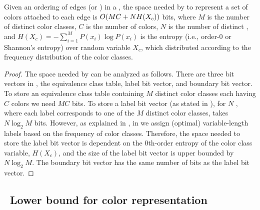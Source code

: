
\begin{theorem}
Given an ordering of edges (or \kmers) in a \dbg, the space needed by \system to
represent a set of colors attached to each edge is $O(MC+N H(X_c))$ bits,
where $M$ is the number of distinct color classes, $C$ is the number of colors,
$N$ is the number of distinct \kmers, and $H(X_c) = -\sum_{i=1}^{M} P(x_i)\log
P(x_i)$ is the entropy (i.e., order-$0$ or Shannon's entropy) over random
variable $X_c$, which distributed according to the frequency distribution of the
color classes.
\label{space-bound} \end{theorem}

\begin{proof}
%
The space needed by \system can be analyzed as follows. There are three bit
vectors in \system, the equivalence class table, label bit vector, and boundary bit
vector. To store an equivalence class table containing $M$ distinct color
classes each having $C$ colors we need $MC$ bits. To store a label bit vector
(as stated in ), for $N$ \kmers, where each label
corresponds to one of the $M$ distinct color classes, takes $N\log_2{M}$ bits.
However, as explained in , in \system we assign (optimal) variable-length
labels based on the frequency of color classes. Therefore, the space needed to
store the label bit vector is dependent on the $0$th-order entropy of the color
class variable, $H(X_c)$, and the size of the label bit vector is upper bounded
by $N\log_2{M}$.  The boundary bit vector has the same number of bits as the
label bit vector. 
%
\end{proof}



\subsection{~Lower bound for color representation}


